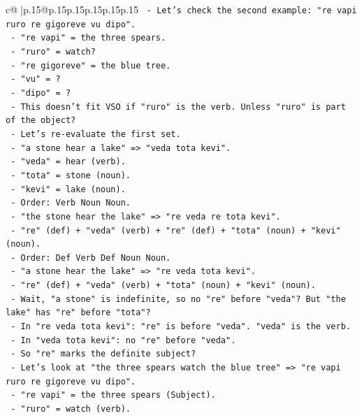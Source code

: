 \documentclass{article}
\begin{document}
{\begin{supertabular}{c@{$\;$}|p{.15\linewidth}@{}p{.15\linewidth}p{.15\linewidth}p{.15\linewidth}p{.15\linewidth}p{.15\linewidth}}
{{{\texttt{     {-} Let's check the second example: "re vapi ruro re gigoreve vu dipo".} \\
\texttt{       {-} "re vapi" = the three spears.} \\
\texttt{       {-} "ruro" = watch?} \\
\texttt{       {-} "re gigoreve" = the blue tree.} \\
\texttt{       {-} "vu" = ?} \\
\texttt{       {-} "dipo" = ?} \\
\texttt{       {-} This doesn't fit VSO if "ruro" is the verb. Unless "ruro" is part of the object?} \\
\texttt{       {-} Let's re{-}evaluate the first set.} \\
\texttt{       {-} "a stone hear a lake" => "veda tota kevi".} \\
\texttt{         {-} "veda" = hear (verb).} \\
\texttt{         {-} "tota" = stone (noun).} \\
\texttt{         {-} "kevi" = lake (noun).} \\
\texttt{         {-} Order: Verb Noun Noun.} \\
\texttt{       {-} "the stone hear the lake" => "re veda re tota kevi".} \\
\texttt{         {-} "re" (def) + "veda" (verb) + "re" (def) + "tota" (noun) + "kevi" (noun).} \\
\texttt{         {-} Order: Def Verb Def Noun Noun.} \\
\texttt{       {-} "a stone hear the lake" => "re veda tota kevi".} \\
\texttt{         {-} "re" (def) + "veda" (verb) + "tota" (noun) + "kevi" (noun).} \\
\texttt{         {-} Wait, "a stone" is indefinite, so no "re" before "veda"? But "the lake" has "re" before "tota"?} \\
\texttt{         {-} In "re veda tota kevi": "re" is before "veda". "veda" is the verb.} \\
\texttt{         {-} In "veda tota kevi": no "re" before "veda".} \\
\texttt{         {-} So "re" marks the definite subject?} \\
\texttt{         {-} Let's look at "the three spears watch the blue tree" => "re vapi ruro re gigoreve vu dipo".} \\
\texttt{           {-} "re vapi" = the three spears (Subject).} \\
\texttt{           {-} "ruro" = watch (verb).} \\
}}}
\end{supertabular}}
\end{document}
